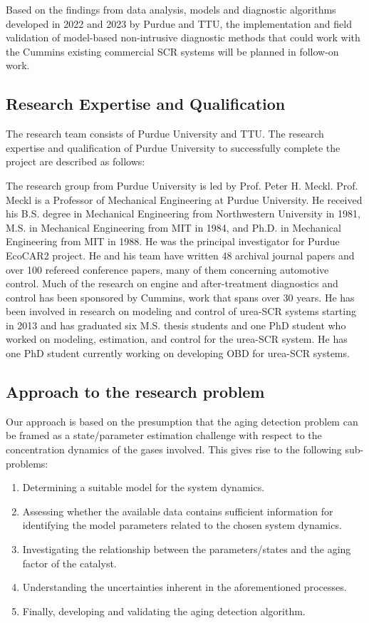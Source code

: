 Based on the findings from data analysis, models and diagnostic algorithms
developed in 2022 and 2023 by Purdue and TTU, the implementation and field
validation of model-based non-intrusive diagnostic methods that could work with
the Cummins existing commercial SCR systems will be planned in follow-on work.

\subsection{Research Expertise and Qualification}
The research team consists of Purdue University and TTU. The research expertise and qualification of Purdue University to successfully complete the project are described as follows:

The research group from Purdue University is led by Prof. Peter H. Meckl. Prof.
Meckl is a Professor of Mechanical Engineering at Purdue University. He
received his B.S. degree in Mechanical Engineering from Northwestern University
in 1981, M.S. in Mechanical Engineering from MIT in 1984, and Ph.D. in
Mechanical Engineering from MIT in 1988. He was the principal investigator for
Purdue EcoCAR2 project. He and his team have written 48 archival journal papers
and over 100 refereed conference papers, many of them concerning automotive
control. Much of the research on engine and after-treatment diagnostics and
control has been sponsored by Cummins, work that spans over 30 years. He has
been involved in research on modeling and control of urea-SCR systems starting
in 2013 and has graduated six M.S. thesis students and one PhD student who
worked on modeling, estimation, and control for the urea-SCR system. He has one
PhD student currently working on developing OBD for urea-SCR systems.


\subsection{Approach to the research problem}
Our approach is based on the presumption that the aging detection problem can be framed as a state/parameter estimation challenge with respect to the concentration dynamics of the gases involved. This gives rise to the following sub-problems:

\begin{enumerate}
\item Determining a suitable model for the system dynamics.
\item Assessing whether the available data contains sufficient information for identifying the model parameters related to the chosen system dynamics.
\item Investigating the relationship between the parameters/states and the aging factor of the catalyst.
\item Understanding the uncertainties inherent in the aforementioned processes.
\item Finally, developing and validating the aging detection algorithm.
\end{enumerate}

